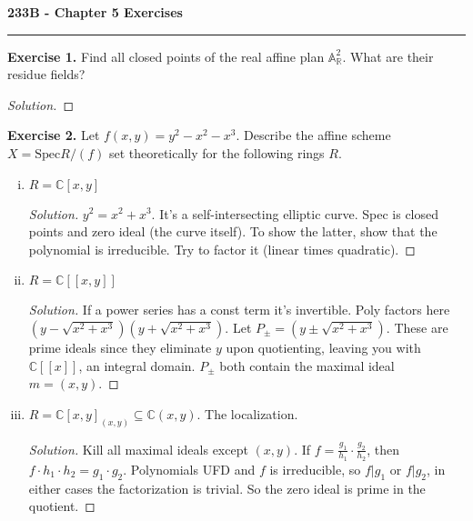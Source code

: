 \documentclass[11pt,letterpaper]{report}
\newcommand{\complex}{\mathbb{C}}
\newcommand{\reals}{\mathbb{R}}
\newcommand{\affine}{\mathbb{A}}
\newcommand{\Spec}{\text{Spec}}
\newenvironment{solution}
{\begin{proof}[Solution]}
{\end{proof}}
\begin{document}
\begin{center}
{\bf \Large 233B - Chapter 5 Exercises} %
\vspace{0.2cm}
\hrule
\end{center}

\noindent\textbf{Exercise 1. }Find all closed points of the real affine plan $\affine^2_\reals$. What are their residue fields?
\begin{solution}
	
\end{solution}

\noindent\textbf{Exercise 2. } Let $f(x,y) = y^2 - x^2 - x^3$. Describe the affine scheme $X = \Spec R/(f)$ set theoretically for the following rings $R$.
\begin{enumerate}[(i)]
	\item $R = \complex[x,y]$
	\begin{solution}
		$y^2 = x^2 + x^3$. It's a self-intersecting elliptic curve. Spec is closed points and zero ideal (the curve itself). To show the latter, show that the polynomial is irreducible. Try to factor it (linear times quadratic). 
	\end{solution}

	\item $R = \complex[[x, y]]$
	\begin{solution}
		If a power series has a const term it's invertible. Poly factors here $(y - \sqrt{x^2+x^3})(y+\sqrt{x^2+x^3})$. Let $P_\pm = (y \pm \sqrt{x^2+x^3})$. These are prime ideals since they eliminate $y$ upon quotienting, leaving you with $\complex[[x]]$, an integral domain. $P_\pm$ both contain the maximal ideal $m = (x,y)$. 
	\end{solution}

	\item $R = \complex[x,y]_{(x,y)}\subseteq \complex(x,y)$. The localization.
	\begin{solution}
		Kill all maximal ideals except $(x,y)$. If $f = \frac{g_1}{h_1}\cdot \frac{g_2}{h_2}$, then $f\cdot h_1\cdot h_2 = g_1\cdot g_2$. Polynomials UFD and $f$ is irreducible, so $f|g_1$ or $f|g_2$, in either cases the factorization is trivial. So the zero ideal is prime in the quotient. 
	\end{solution}
\end{enumerate}
\end{document}
